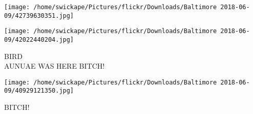 \documentclass[10pt,letterpaper]{article}
\begin{document}
\texttt{[image: /home/swickape/Pictures/flickr/Downloads/Baltimore 2018-06-09/42739630351.jpg]}

\vspace{0.25in}
\texttt{[image: /home/swickape/Pictures/flickr/Downloads/Baltimore 2018-06-09/42022440204.jpg]}

BIRD\\
AUNUAE WAS HERE BITCH!
\pagebreak

\texttt{[image: /home/swickape/Pictures/flickr/Downloads/Baltimore 2018-06-09/40929121350.jpg]}

BITCH!
\pagebreak
\end{document}
